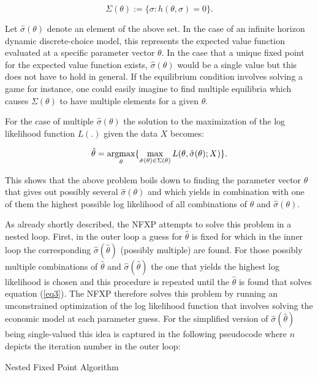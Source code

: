\begin{equation}
\Sigma(\theta) := \{\sigma:h(\theta, \sigma)=0\}.
\end{equation}

Let $\hat{\sigma}(\theta)$ denote an element of the above set. In the case of an infinite horizon dynamic discrete-choice model, this represents the expected value function evaluated at a specific parameter vector $\theta$. In the case that a unique fixed point for the expected value function exists, $\hat{\sigma}(\theta)$ would be a single value but this does not have to hold in general. If the equilibrium condition involves solving a game for instance, one could easily imagine to find multiple equilibria which causes $\Sigma(\theta)$ to have multiple elements for a given $\theta$.

For the case of multiple $\hat{\sigma}(\theta)$ the solution to the maximization of the log likelihood function $L(.)$ given the data $X$ becomes:

\begin{equation}
\hat\theta = \operatorname*{argmax}_{\theta} \{ \max_{\hat\sigma(\theta)\in\Sigma(\theta)} L(\theta,\hat\sigma(\theta); X)\}.
\label{eq3}
\end{equation}

This shows that the above problem boils down to finding the parameter vector $\theta$ that gives out possibly several $\hat{\sigma}(\theta)$ and which yields in combination with one of them the highest possible log likelihood of all combinations of $\theta$ and $\hat{\sigma}(\theta)$.

As already shortly described, the NFXP attempts to solve this problem in a nested loop. First, in the outer loop a guess for $\hat{\theta}$ is fixed for which in the inner loop the corresponding $\hat{\sigma}(\hat\theta)$ (possibly multiple) are found. For those possibly multiple combinations of $\hat\theta$ and $\hat\sigma(\hat\theta)$ the one that yields the highest log likelihood is chosen and this procedure is repeated until the $\hat{\theta}$ is found that solves equation (\ref{eq3}). The NFXP therefore solves this problem by running an unconstrained optimization of the log likelihood function that involves solving the economic model at each parameter guess. For the simplified version of $\hat{\sigma}(\hat\theta)$ being single-valued this idea is captured in the following pseudocode where $n$ depicts the iteration number in the outer loop:

\vspace{2ex}
\begin{algorithm}[H]
	\SetAlgoLined
	\caption{Nested Fixed Point Algorithm}
\end{algorithm}
\vspace{2ex}

